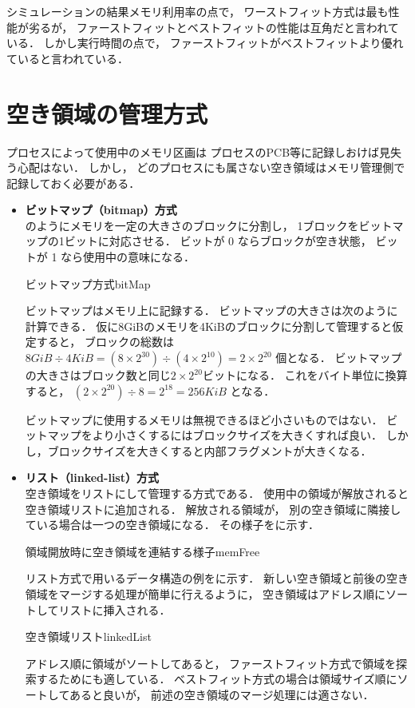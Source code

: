シミュレーションの結果メモリ利用率の点で，
ワーストフィット方式は最も性能が劣るが，
ファーストフィットとベストフィットの性能は互角だと言われている．
しかし実行時間の点で，
ファーストフィットがベストフィットより優れていると言われている．

\section{空き領域の管理方式}
プロセスによって使用中のメモリ区画は
プロセスのPCB等に記録しおけば見失う心配はない．
しかし，
どのプロセスにも属さない空き領域はメモリ管理側で記録しておく必要がある．

\begin{itemize}
\item {\bf ビットマップ（bitmap）方式}\\
のようにメモリを一定の大きさのブロックに分割し，
1ブロックをビットマップの1ビットに対応させる．
ビットが 0 ならブロックが空き状態，
ビットが 1 なら使用中の意味になる．

{ビットマップ方式}{bitMap}

ビットマップはメモリ上に記録する．
ビットマップの大きさは次のように計算できる．
仮に8GiBのメモリを4KiBのブロックに分割して管理すると仮定すると，
ブロックの総数は
$8GiB \div 4KiB = (8\times 2^{30}) \div (4 \times 2^{10}) = 2 \times 2^{20}$
個となる．
ビットマップの大きさはブロック数と同じ$2 \times 2^{20}$ビットになる．
これをバイト単位に換算すると，
$(2 \times 2^{20}) \div 8 = 2^{18} = 256KiB$
となる．

ビットマップに使用するメモリは無視できるほど小さいものではない．
ビットマップをより小さくするにはブロックサイズを大きくすれば良い．
しかし，ブロックサイズを大きくすると内部フラグメントが大きくなる．

\item {\bf リスト（linked-list）方式}\\
空き領域をリストにして管理する方式である．
使用中の領域が解放されると空き領域リストに追加される．
解放される領域が，
別の空き領域に隣接している場合は一つの空き領域になる．
その様子をに示す．

{領域開放時に空き領域を連結する様子}{memFree}

リスト方式で用いるデータ構造の例をに示す．
新しい空き領域と前後の空き領域をマージする処理が簡単に行えるように，
空き領域はアドレス順にソートしてリストに挿入される．

{空き領域リスト}{linkedList}

アドレス順に領域がソートしてあると，
ファーストフィット方式で領域を探索するためにも適している．
ベストフィット方式の場合は領域サイズ順にソートしてあると良いが，
前述の空き領域のマージ処理には適さない．

\end{itemize}


